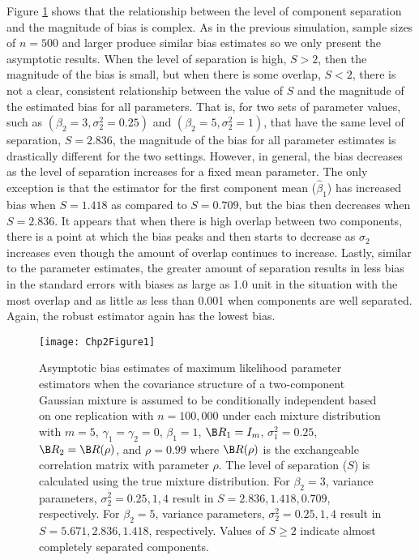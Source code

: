 Figure \ref{fig:2-1} shows that the relationship between the level of component separation and the magnitude of bias is complex. As in the previous simulation, sample sizes of $n=500$ and larger produce similar bias estimates so we only present the asymptotic results. When the level of separation is high, $S>2$, then the magnitude of the bias is small, but when there is some overlap, $S<2$, there is not a clear, consistent relationship between the value of $S$ and the magnitude of the estimated bias for all parameters. That is, for two sets of parameter values, such as $(\beta_{2}=3,\sigma^{2}_{2}=0.25)$ and $(\beta_{2}=5,\sigma^{2}_{2}=1)$, that have the same level of separation, $S = 2.836$, the magnitude of the bias for all parameter estimates is drastically different for the two settings. However, in general, the bias decreases as the level of separation increases for a fixed mean parameter. The only exception is that the estimator for the first component mean ($\widehat{\beta}_{1}$) has increased bias when $S=1.418$ as compared to $S=0.709$, but the bias then decreases when $S=2.836$. It appears that when there is high overlap between two components, there is a point at which the bias peaks and then starts to decrease as $\sigma_2$ increases even though the amount of overlap continues to increase. Lastly, similar to the parameter estimates, the greater amount of separation results in less bias in the standard errors with biases as large as 1.0 unit in the situation with the most overlap and as little as less than 0.001 when components are well separated. Again, the robust estimator again has the lowest bias. 
\begin{figure}
\begin{center}
\texttt{[image: Chp2Figure1]}
\end{center}
\caption{Asymptotic bias estimates of maximum likelihood parameter estimators when the covariance structure of a two-component Gaussian mixture is assumed to be conditionally independent based on one replication with $n=100,000$ under each mixture distribution with $m=5$, $\gamma_1=\gamma_2=0$, $\beta_{1}=1$, $\B R_1=I_{m}$, $\sigma_1^{2}=0.25$,  $\B R_2=\B R(\rho)$, and $\rho=0.99$ where $\B R(\rho)$ is the exchangeable correlation matrix with parameter $\rho$. The level of separation ($S$) is calculated using the true mixture distribution. For $\beta_{2} = 3$, variance parameters, $\sigma_{2}^{2}=0.25,1,4$ result in $S=2.836,1.418, 0.709$, respectively. For $\beta_{2} = 5$, variance parameters, $\sigma_{2}^{2}=0.25,1,4$ result in $S=5.671,2.836,1.418$, respectively. Values of $S\geq 2$ indicate almost completely separated components.}
\label{fig:2-1}
\end{figure}

